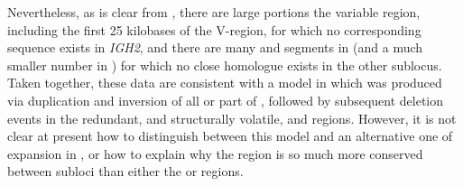 Nevertheless, as is clear from , there are large portions the  variable region, including the first 25 kilobases of the V-region, for which no corresponding sequence exists in \textit{IGH2}, and there are many \vh and \dh segments in  (and a much smaller number in ) for which no close homologue exists in the other sublocus. Taken together, these data are consistent with a model in which  was produced via duplication and inversion of all or part of , followed by subsequent deletion events in the redundant, and structurally volatile,  \vh and \dh regions. However, it is not clear at present how to distinguish between this model and an alternative one of expansion in , or how to explain why the \jh region is so much more conserved between subloci than either the \vh or \dh regions.

